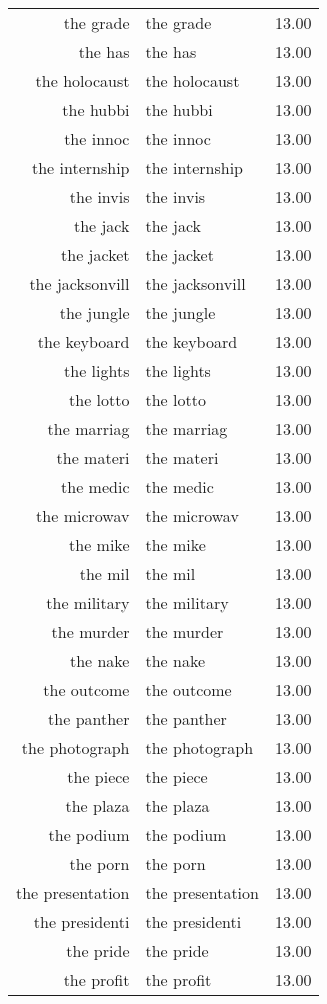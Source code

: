 \begin{table}[ht]
\begin{tabular}{rlr}
  the grade & the grade & 13.00 \\ 
  the has & the has & 13.00 \\ 
  the holocaust & the holocaust & 13.00 \\ 
  the hubbi & the hubbi & 13.00 \\ 
  the innoc & the innoc & 13.00 \\ 
  the internship & the internship & 13.00 \\ 
  the invis & the invis & 13.00 \\ 
  the jack & the jack & 13.00 \\ 
  the jacket & the jacket & 13.00 \\ 
  the jacksonvill & the jacksonvill & 13.00 \\ 
  the jungle & the jungle & 13.00 \\ 
  the keyboard & the keyboard & 13.00 \\ 
  the lights & the lights & 13.00 \\ 
  the lotto & the lotto & 13.00 \\ 
  the marriag & the marriag & 13.00 \\ 
  the materi & the materi & 13.00 \\ 
  the medic & the medic & 13.00 \\ 
  the microwav & the microwav & 13.00 \\ 
  the mike & the mike & 13.00 \\ 
  the mil & the mil & 13.00 \\ 
  the military & the military & 13.00 \\ 
  the murder & the murder & 13.00 \\ 
  the nake & the nake & 13.00 \\ 
  the outcome & the outcome & 13.00 \\ 
  the panther & the panther & 13.00 \\ 
  the photograph & the photograph & 13.00 \\ 
  the piece & the piece & 13.00 \\ 
  the plaza & the plaza & 13.00 \\ 
  the podium & the podium & 13.00 \\ 
  the porn & the porn & 13.00 \\ 
  the presentation & the presentation & 13.00 \\ 
  the presidenti & the presidenti & 13.00 \\ 
  the pride & the pride & 13.00 \\ 
  the profit & the profit & 13.00 \\ 

\end{tabular}
\end{table}
